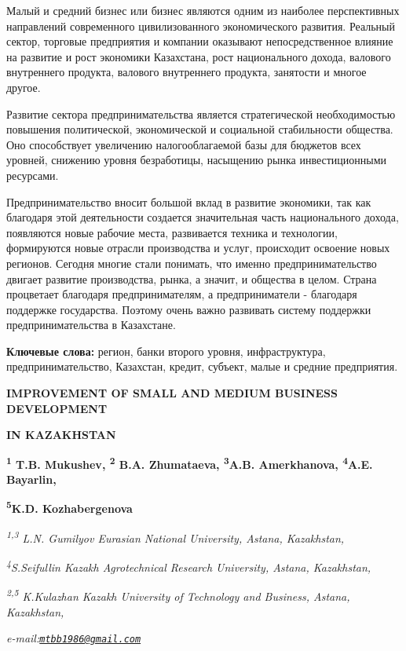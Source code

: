 Малый и средний бизнес или бизнес являются одним из наиболее
перспективных направлений современного цивилизованного экономического
развития. Реальный сектор, торговые предприятия и компании оказывают
непосредственное влияние на развитие и рост экономики Казахстана, рост
национального дохода, валового внутреннего продукта, валового
внутреннего продукта, занятости и многое другое.

Развитие сектора предпринимательства является стратегической
необходимостью повышения политической, экономической и социальной
стабильности общества. Оно способствует увеличению налогооблагаемой базы
для бюджетов всех уровней, снижению уровня безработицы, насыщению рынка
инвестиционными ресурсами.

Предпринимательство вносит большой вклад в развитие экономики, так как
благодаря этой деятельности создается значительная часть национального
дохода, появляются новые рабочие места, развивается техника и
технологии, формируются новые отрасли производства и услуг, происходит
освоение новых регионов. Сегодня многие стали понимать, что именно
предпринимательство двигает развитие производства, рынка, а значит, и
общества в целом. Страна процветает благодаря предпринимателям, а
предприниматели - благодаря поддержке государства. Поэтому очень важно
развивать систему поддержки предпринимательства в Казахстане.

{\bfseries Ключевые слова:} регион, банки второго уровня, инфраструктура,
предпринимательство, Казахстан, кредит, субъект, малые и средние
предприятия.

{\bfseries IMPROVEMENT OF SMALL AND MEDIUM BUSINESS DEVELOPMENT}

{\bfseries IN KAZAKHSTAN}

{\bfseries \textsuperscript{1} T.B. Mukushev\textsuperscript{\envelope },
\textsuperscript{2} B.A. Zhumataeva, \textsuperscript{3}A.B.
Amerkhanova, \textsuperscript{4}A.E. Bayarlin,}

{\bfseries \textsuperscript{5}K.D. Kozhabergenova}

\emph{\textsuperscript{1,3} L.N. Gumilyov Eurasian National University,
Astana, Kazakhstan,}

\emph{\textsuperscript{4}S.Seifullin Kazakh Agrotechnical Research
University, Astana, Kazakhstan,}

\emph{\textsuperscript{2,5} K.Kulazhan Kazakh University of Technology
and Business, Astana, Kazakhstan,}

\emph{e-mail:\href{mailto:mtbb1986@gmail.com}{\nolinkurl{mtbb1986@gmail.com}}}

